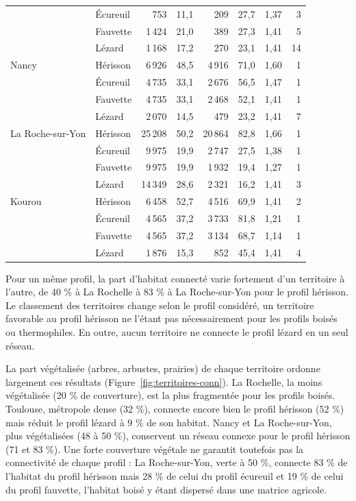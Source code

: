 \documentclass[a4paper,12pt]{report}
\begin{document}
\begin{table}[H]
\begin{tabular}{@{}llrrrrrr@{}}
 & Écureuil & 753 & 11,1 & 209 & 27,7 & 1,37 & 3 \\
 & Fauvette & 1\,424 & 21,0 & 389 & 27,3 & 1,41 & 5 \\
 & Lézard & 1\,168 & 17,2 & 270 & 23,1 & 1,41 & 14 \\
\addlinespace
Nancy & Hérisson & 6\,926 & 48,5 & 4\,916 & 71,0 & 1,60 & 1 \\
 & Écureuil & 4\,735 & 33,1 & 2\,676 & 56,5 & 1,47 & 1 \\
 & Fauvette & 4\,735 & 33,1 & 2\,468 & 52,1 & 1,41 & 1 \\
 & Lézard & 2\,070 & 14,5 & 479 & 23,2 & 1,41 & 7 \\
\addlinespace
La Roche-sur-Yon & Hérisson & 25\,208 & 50,2 & 20\,864 & 82,8 & 1,66 & 1 \\
 & Écureuil & 9\,975 & 19,9 & 2\,747 & 27,5 & 1,38 & 1 \\
 & Fauvette & 9\,975 & 19,9 & 1\,932 & 19,4 & 1,27 & 1 \\
 & Lézard & 14\,349 & 28,6 & 2\,321 & 16,2 & 1,41 & 3 \\
\addlinespace
Kourou & Hérisson & 6\,458 & 52,7 & 4\,516 & 69,9 & 1,41 & 2 \\
 & Écureuil & 4\,565 & 37,2 & 3\,733 & 81,8 & 1,21 & 1 \\
 & Fauvette & 4\,565 & 37,2 & 3\,134 & 68,7 & 1,14 & 1 \\
 & Lézard & 1\,876 & 15,3 & 852 & 45,4 & 1,41 & 4 \\
\bottomrule
\end{tabular}
\end{table}

Pour un même profil, la part d'habitat connecté varie fortement d'un territoire à l'autre, de 40 \% à La Rochelle à 83 \% à La Roche-sur-Yon pour le profil hérisson. Le classement des territoires change selon le profil considéré, un territoire favorable au profil hérisson ne l'étant pas nécessairement pour les profils boisés ou thermophiles. En outre, aucun territoire ne connecte le profil lézard en un seul réseau.

La part végétalisée (arbres, arbustes, prairies) de chaque territoire ordonne largement ces résultats (Figure~\ref{fig:territoires-conn}). La Rochelle, la moins végétalisée (20 \% de couverture), est la plus fragmentée pour les profils boisés. Toulouse, métropole dense (32 \%), connecte encore bien le profil hérisson (52 \%) mais réduit le profil lézard à 9 \% de son habitat. Nancy et La Roche-sur-Yon, plus végétalisées (48 à 50 \%), conservent un réseau connexe pour le profil hérisson (71 et 83 \%). Une forte couverture végétale ne garantit toutefois pas la connectivité de chaque profil : La Roche-sur-Yon, verte à 50 \%, connecte 83 \% de l'habitat du profil hérisson mais 28 \% de celui du profil écureuil et 19 \% de celui du profil fauvette, l'habitat boisé y étant dispersé dans une matrice agricole.
\end{document}
